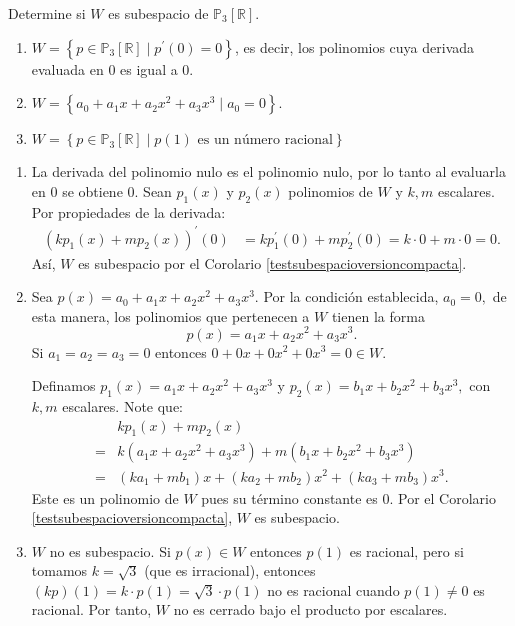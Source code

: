 \begin{example} Determine si $W$ es subespacio de $\mathbb{P}_{3}\left[\mathbb{R}\right].$ 
\begin{enumerate}[$(a)$]
\item $W=\left\lbrace p \in \mathbb{P}_{3}\left[\mathbb{R}\right]  \mid p^{\prime}(0)=0  \right\rbrace$, es decir, los polinomios cuya derivada evaluada en $0$ es igual a $0.$
\item $W=\left\lbrace a_0+a_1 x+ a_2 x^2+ a_3 x^3  \mid a_0=0   \right\rbrace.$
\item $W=\left\lbrace p \in \mathbb{P}_{3}\left[\mathbb{R}\right]  \mid p(1) \text{ es un número racional}  \right\rbrace$
\end{enumerate}
\begin{myproof}\begin{enumerate}[$(a)$]
\item La derivada del polinomio nulo es el polinomio nulo, por lo tanto al evaluarla en $0$ se obtiene $0.$ Sean $p_1(x)$ y $p_2(x)$ polinomios de $W$ y $k,m$ escalares. Por propiedades de la derivada: 
\begin{align*}
\left(kp_1(x)+mp_2(x)\right)^{\prime}(0)&=kp_1^{\prime}(0)+mp_2^{\prime}(0)=k\cdot 0+m\cdot 0=0. 
\end{align*}
Así, $W$ es subespacio por el Corolario \ref{testsubespacioversioncompacta}. 
\item Sea $p(x)=a_0+a_1 x+ a_2 x^2+ a_3 x^3.$ Por la condición establecida, $a_0=0,$ de esta manera, los polinomios que pertenecen a $W$ tienen la forma $$p(x)=a_1 x+ a_2 x^2+ a_3 x^3.$$ Si $a_1=a_2=a_3=0$ entonces $0+0x+0x^2+0x^3=0\in W.$ 

Definamos $p_{1}(x)=a_1 x+ a_2 x^2+ a_3 x^3$ y $p_{2}(x)=b_1 x+ b_2 x^2+ b_3 x^3,$ con $k,m$ escalares. Note que:
\begin{align*}
&kp_1(x)+mp_2(x)\\=&k\left(a_1 x+ a_2 x^2+ a_3 x^3 \right) + m\left(b_1 x+ b_2 x^2+ b_3 x^3 \right)\\=&(ka_1+mb_1)x+(ka_2+mb_2)x^2+(ka_3+mb_3)x^3.
\end{align*}
Este es un polinomio de $W$ pues su término constante es $0$. Por el Corolario \ref{testsubespacioversioncompacta}, $W$ es subespacio. 

\item $W$ no es subespacio. Si $p(x)\in W$ entonces $p(1)$ es racional, pero si tomamos $k=\sqrt{3}$ (que es irracional), entonces $(kp)(1) = k \cdot p(1) = \sqrt{3} \cdot p(1)$ no es racional cuando $p(1)\neq 0$ es racional. Por tanto, $W$ no es cerrado bajo el producto por escalares.
\end{enumerate} 
\end{myproof}
\end{example}


